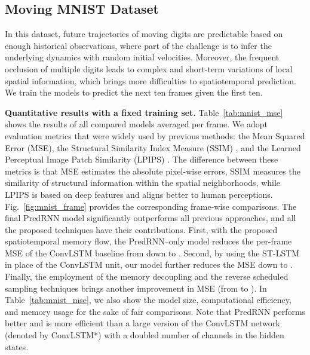 \documentclass[10pt,journal,compsoc]{IEEEtran}
\newcommand{\tab}[1]{Table~\ref{#1}}
\newcommand{\fig}[1]{Fig.~\ref{#1}}
\newcommand{\myparagraph}[1]{\vspace{5pt} \noindent \textbf{#1.}}
\begin{document}
\subsection{Moving MNIST Dataset}
\label{sec:mnist}

In this dataset, future trajectories of moving digits are predictable based on enough historical observations, where part of the challenge is to infer the underlying dynamics with random initial velocities.
Moreover, the frequent occlusion of multiple digits leads to complex and short-term variations of local spatial information, which brings more difficulties to spatiotemporal prediction.
We train the models to predict the next ten frames given the first ten.


\myparagraph{Quantitative results with a fixed training set}
\tab{tab:mnist_mse} shows the results of all compared models averaged per frame. We adopt evaluation metrics that were widely used by previous methods: the Mean Squared Error (MSE), the Structural Similarity Index Measure (SSIM) \cite{Wang2004Image}, and the Learned Perceptual Image Patch Similarity (LPIPS) \cite{zhang2018unreasonable}.
The difference between these metrics is that MSE estimates the absolute pixel-wise errors, SSIM measures the similarity of structural information within the spatial neighborhoods, while LPIPS is based on deep features and aligns better to human perceptions.
\fig{fig:mnist_frame} provides the corresponding frame-wise comparisons. The final PredRNN model significantly outperforms all previous approaches, and all the proposed techniques have their contributions. 
First, with the proposed spatiotemporal memory flow, the PredRNN--only model reduces the per-frame MSE of the ConvLSTM baseline from  down to . 
Second, by using the ST-LSTM in place of the ConvLSTM unit, our model further reduces the MSE down to . 
Finally, the employment of the memory decoupling and the reverse scheduled sampling techniques brings another  improvement in MSE (from  to ). 
In \tab{tab:mnist_mse}, we also show the model size, computational efficiency, and memory usage for the sake of fair comparisons. 
Note that PredRNN performs better and is more efficient than a large version of the ConvLSTM network (denoted by ConvLSTM*) with a doubled number of channels in the hidden states.
\end{document}

